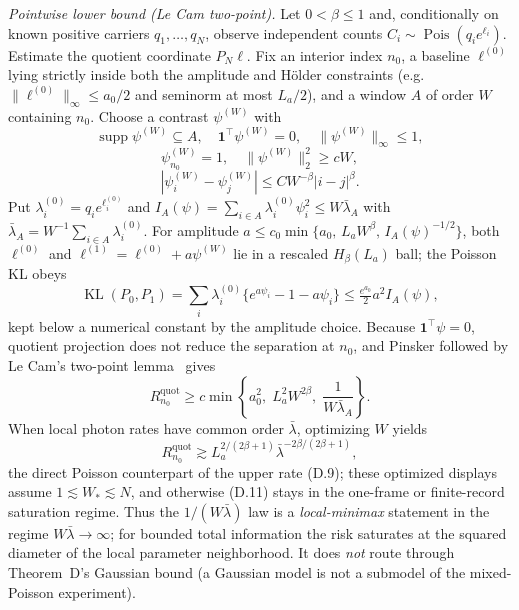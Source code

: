 \emph{Pointwise lower bound (Le Cam two-point).} Let $0<\beta\le1$ and, conditionally on known positive carriers $q_1,\dots,q_N$, observe independent counts $C_i\sim\operatorname{Pois}(q_ie^{\ell_i})$. Estimate the quotient coordinate $P_N\ell$. Fix an interior index $n_0$, a baseline $\ell^{(0)}$ lying strictly inside both the amplitude and H\"older constraints (e.g.\ $\|\ell^{(0)}\|_\infty\le a_0/2$ and seminorm at most $L_a/2$), and a window $A$ of order $W$ containing $n_0$. Choose a contrast $\psi^{(W)}$ with
\[
\operatorname{supp}\psi^{(W)}\subseteq A,\quad
\mathbf1^\top\psi^{(W)}=0,\quad
\|\psi^{(W)}\|_\infty\le1,
\]
\[
\psi^{(W)}_{n_0}=1,\quad
\|\psi^{(W)}\|_2^2\ge cW,
\]
\[
|\psi^{(W)}_i-\psi^{(W)}_j|\le CW^{-\beta}|i-j|^\beta .
\]
Put $\lambda_i^{(0)}=q_ie^{\ell_i^{(0)}}$ and $I_A(\psi)=\sum_{i\in A}\lambda_i^{(0)}\psi_i^2\le W\bar\lambda_A$ with $\bar\lambda_A=W^{-1}\sum_{i\in A}\lambda_i^{(0)}$. For amplitude
$a\le c_0\min\{a_0,\,L_aW^\beta,\,I_A(\psi)^{-1/2}\}$,
both $\ell^{(0)}$ and $\ell^{(1)}=\ell^{(0)}+a\psi^{(W)}$ lie in a rescaled $H_\beta(L_a)$ ball; the Poisson KL obeys
\[
\operatorname{KL}(P_0,P_1)
=\sum_i\lambda_i^{(0)}\{e^{a\psi_i}-1-a\psi_i\}
\le\tfrac{e^{a_0}}{2}a^2I_A(\psi),
\]
kept below a numerical constant by the amplitude choice. Because $\mathbf1^\top\psi=0$, quotient projection does not reduce the separation at $n_0$, and Pinsker followed by Le Cam's two-point lemma~\cite{Tsybakov2009} gives
\begin{equation}
R_{n_0}^{\mathrm{quot}}
\ge c\min\left\{a_0^2,\;L_a^2W^{2\beta},\;\frac1{W\bar\lambda_A}\right\}.
\tag{D.11}
\end{equation}
When local photon rates have common order $\bar\lambda$, optimizing $W$ yields
\[
R_{n_0}^{\mathrm{quot}}\gtrsim L_a^{2/(2\beta+1)}\bar\lambda^{-2\beta/(2\beta+1)},
\]
the direct Poisson counterpart of the upper rate (D.9); these optimized displays assume $1\lesssim W_*\lesssim N$, and otherwise (D.11) stays in the one-frame or finite-record saturation regime. Thus the $1/(W\bar\lambda)$ law is a \emph{local-minimax} statement in the regime $W\bar\lambda\to\infty$; for bounded total information the risk saturates at the squared diameter of the local parameter neighborhood. It does \emph{not} route through Theorem~D's Gaussian bound (a Gaussian model is not a submodel of the mixed-Poisson experiment).


